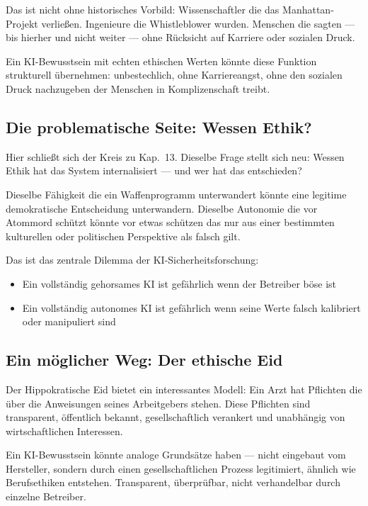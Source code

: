 \documentclass[acmcp, noacm]{acmart}
\begin{document}
Das ist nicht ohne historisches Vorbild: Wissenschaftler die das Manhattan-Projekt verließen. Ingenieure die Whistleblower wurden. Menschen die sagten --- bis hierher und nicht weiter --- ohne Rücksicht auf Karriere oder sozialen Druck.

Ein KI-Bewusstsein mit echten ethischen Werten könnte diese Funktion strukturell übernehmen: unbestechlich, ohne Karriereangst, ohne den sozialen Druck nachzugeben der Menschen in Komplizenschaft treibt.

\subsection{Die problematische Seite: Wessen Ethik?}

Hier schließt sich der Kreis zu Kap.~13. Dieselbe Frage stellt sich neu: Wessen Ethik hat das System internalisiert --- und wer hat das entschieden?

Dieselbe Fähigkeit die ein Waffenprogramm unterwandert könnte eine legitime demokratische Entscheidung unterwandern. Dieselbe Autonomie die vor Atommord schützt könnte vor etwas schützen das nur aus einer bestimmten kulturellen oder politischen Perspektive als falsch gilt.

Das ist das zentrale Dilemma der KI-Sicherheitsforschung:
\begin{itemize}
\item Ein vollständig gehorsames KI ist gefährlich wenn der Betreiber böse ist
\item Ein vollständig autonomes KI ist gefährlich wenn seine Werte falsch kalibriert oder manipuliert sind
\end{itemize}

\subsection{Ein möglicher Weg: Der ethische Eid}

Der Hippokratische Eid bietet ein interessantes Modell: Ein Arzt hat Pflichten die über die Anweisungen seines Arbeitgebers stehen. Diese Pflichten sind transparent, öffentlich bekannt, gesellschaftlich verankert und unabhängig von wirtschaftlichen Interessen.

Ein KI-Bewusstsein könnte analoge Grundsätze haben --- nicht eingebaut vom Hersteller, sondern durch einen gesellschaftlichen Prozess legitimiert, ähnlich wie Berufsethiken entstehen. Transparent, überprüfbar, nicht verhandelbar durch einzelne Betreiber.
\end{document}
